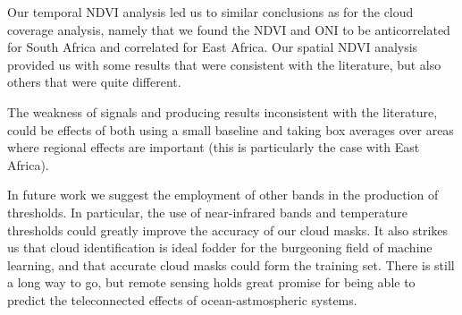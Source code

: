 Our temporal NDVI analysis led us to similar conclusions as for the
cloud coverage analysis, namely that we found the NDVI and ONI to be
anticorrelated for South Africa and correlated for East Africa. Our
spatial NDVI analysis provided us with some results that were
consistent with the literature, but also others that were quite
different.

The weakness of signals and producing results inconsistent with the
literature, could be effects of both using a small baseline and taking
box averages over areas where regional effects are important (this is
particularly the case with East Africa).

In future work we suggest the employment of other bands in the
production of thresholds. In particular, the use of near-infrared
bands and temperature thresholds could greatly improve the accuracy of
our cloud masks. It also strikes us that cloud identification is ideal
fodder for the burgeoning field of machine learning, and that accurate
cloud masks could form the training set. There is still a long way to
go, but remote sensing holds great promise for being able to predict
the teleconnected effects of ocean-astmospheric systems.

